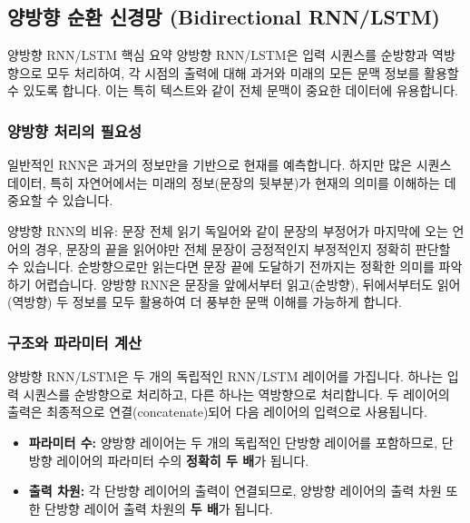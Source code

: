 \documentclass[11pt,a4paper]{article}
\begin{document}
\subsection{양방향 순환 신경망 (Bidirectional RNN/LSTM)}
\begin{summarybox}{양방향 RNN/LSTM 핵심 요약}
양방향 RNN/LSTM은 입력 시퀀스를 순방향과 역방향으로 모두 처리하여, 각 시점의 출력에 대해 과거와 미래의 모든 문맥 정보를 활용할 수 있도록 합니다. 이는 특히 텍스트와 같이 전체 문맥이 중요한 데이터에 유용합니다.
\end{summarybox}

\subsubsection{양방향 처리의 필요성}
일반적인 RNN은 과거의 정보만을 기반으로 현재를 예측합니다. 하지만 많은 시퀀스 데이터, 특히 자연어에서는 미래의 정보(문장의 뒷부분)가 현재의 의미를 이해하는 데 중요할 수 있습니다.

\begin{examplebox}{양방향 RNN의 비유: 문장 전체 읽기}
독일어와 같이 문장의 부정어가 마지막에 오는 언어의 경우, 문장의 끝을 읽어야만 전체 문장이 긍정적인지 부정적인지 정확히 판단할 수 있습니다. 순방향으로만 읽는다면 문장 끝에 도달하기 전까지는 정확한 의미를 파악하기 어렵습니다. 양방향 RNN은 문장을 앞에서부터 읽고(순방향), 뒤에서부터도 읽어(역방향) 두 정보를 모두 활용하여 더 풍부한 문맥 이해를 가능하게 합니다.
\end{examplebox}

\subsubsection{구조와 파라미터 계산}
양방향 RNN/LSTM은 두 개의 독립적인 RNN/LSTM 레이어를 가집니다. 하나는 입력 시퀀스를 순방향으로 처리하고, 다른 하나는 역방향으로 처리합니다. 두 레이어의 출력은 최종적으로 연결(concatenate)되어 다음 레이어의 입력으로 사용됩니다.

\begin{tcolorbox}[title=\textbf{양방향 RNN/LSTM의 파라미터 및 출력 차원}, colback=myblue!10!white, colframe=myblue!75!black]
\begin{itemize}
    \item \textbf{파라미터 수:} 양방향 레이어는 두 개의 독립적인 단방향 레이어를 포함하므로, 단방향 레이어의 파라미터 수의 \textbf{정확히 두 배}가 됩니다.
    \item \textbf{출력 차원:} 각 단방향 레이어의 출력이 연결되므로, 양방향 레이어의 출력 차원 또한 단방향 레이어 출력 차원의 \textbf{두 배}가 됩니다.
\end{itemize}
\end{tcolorbox}
\end{document}
